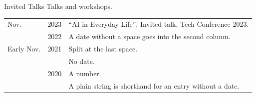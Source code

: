 \documentclass{resume}
\begin{document}
    \begin{rSection}{ Invited Talks }Talks and workshops.\par
    \begin{tabular}{p{0.5cm} p{1cm} p{14cm}}
    Nov. & 2023 & ``AI in Everyday Life'', Invited talk, Tech Conference 2023. \\
     & 2022 & A date without a space goes into the second column. \\
    Early Nov. & 2021 & Split at the last space. \\
     &  & No date. \\
     & 2020 & A number. \\
     &  & A plain string is shorthand for an entry without a date. \\
    \end{tabular}
    \end{rSection}
\end{document}
